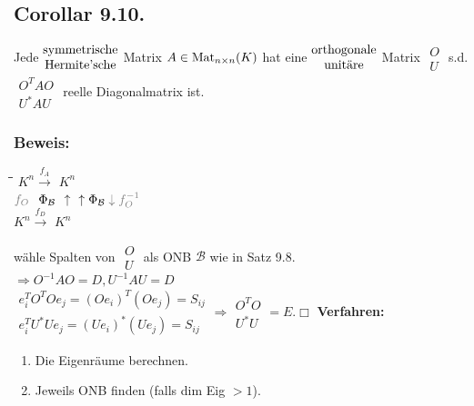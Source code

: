 \documentclass[a4paper, 12pt]{extarticle}
\newcommand{\tn}[1]{\textnormal {#1}}
\newcommand{\transp}[2][50]{\color{black!#1}#2}
\begin{document}
\subsection*{Corollar 9.10.}
Jede $\begin{matrix}\tn{symmetrische}\\\tn{Hermite'sche}\end{matrix}$ Matrix $A \in \tn{Mat}_{n \times n}(K)$ hat eine $\begin{matrix}\tn{orthogonale}\\\tn{unitäre}\end{matrix}$ Matrix $\begin{matrix}O\\U\end{matrix}$ s.d. $\begin{matrix}O^TAO\\U^*AU\end{matrix}$ reelle Diagonalmatrix ist.
\subsubsection*{Beweis:}
\begin{tabbing}
	\hspace{15pt}\=\hspace{45pt}\=\hspace{2cm}\= \kill
	\>$K^n \xrightarrow{f_A}$ \>$K^n$\\
	$\transp{f_O}$ $\tn{ }\Phi{_\mathcal B}$ \>$\uparrow$ \>$\uparrow \Phi_\mathcal B \transp{\downarrow f_O^{-1}}$\\
	\>$K^n \xrightarrow{f_D}$ \>$K^n$
\end{tabbing} wähle Spalten von $\begin{matrix}O\\U\end{matrix}$ als ONB $\mathcal{B}$ wie in Satz 9.8.\\
$\Rightarrow O^{-1}AO = D, U^{-1}AU = D$\\[10pt]
$\begin{matrix}e_i^TO^TOe_j = (Oe_i)^T(Oe_j) = S_{ij}\\e_i^TU^*Ue_j = (Ue_i)^*(Ue_j) = S_{ij}\end{matrix} \Rightarrow \begin{matrix}O^TO\\U^*U\end{matrix} = E. \Box$\newpage
\textbf{Verfahren:}
\begin{enumerate}[label=\arabic*)]
	\item Die Eigenräume berechnen.
	\item Jeweils ONB finden (falls dim Eig $> 1$).
\end{enumerate}
\end{document}
